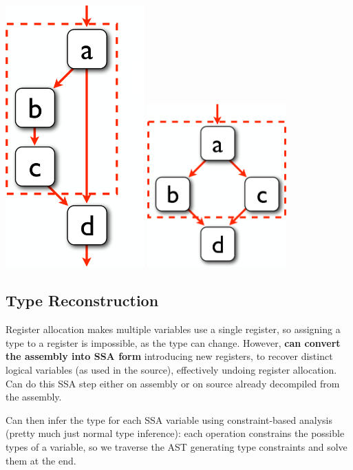 \documentclass[a4paper, 11pt]{article}
\begin{document}
{\begin{minipage}[t]{0.47\textwidth}
    \includegraphics[width=0.4\textwidth]{if.png}
    \includegraphics[width=0.4\textwidth]{ifelse.png}
    \end{minipage}

    \subsection*{Type Reconstruction}
    {
        Register allocation makes multiple variables use a single register, so assigning a type to a register is impossible, as the type can change. However, \textbf{can convert the assembly into SSA form} introducing new registers, to recover distinct logical variables (as used in the source), effectively undoing register allocation. Can do this SSA step either on assembly or on source already decompiled from the assembly.

        Can then infer the type for each SSA variable using constraint-based analysis (pretty much just normal type inference): each operation constrains the possible types of a variable, so we traverse the AST generating type constraints and solve them at the end.
    }
}
\end{document}
